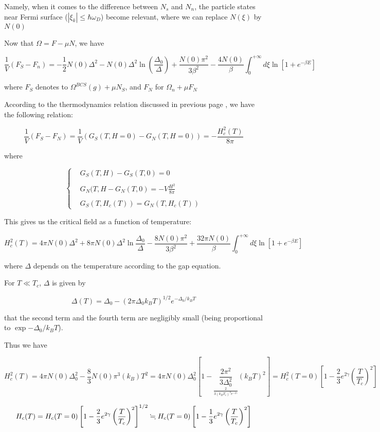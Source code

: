 Namely, when it comes to the difference between $N_s$ and $N_n$, the particle states near Fermi surface (${|\xi_k|\le \hbar\omega_D}$) become relevant, where we can replace $N(\xi)$ by $N(0)$

Now that $\Omega = F-\mu N$, we have

\[\frac{1}{V}(F_S-F_n) = -\frac{1}{2}N(0)\Delta^2 - N(0)\Delta^2\ln\left(\frac{\Delta_0}{\Delta}\right) + \frac{N(0)\pi^2}{3\beta^2}-\frac{4N(0)}{\beta}\int_0^{+\infty}d\xi\ln[1+e^{-\beta E}] \]

where $F_S$ denotes to $\Omega^{BCS}(g)+\mu N_S$, and $F_N$ for $\Omega_n + \mu F_N$

According to the thermodynamics relation discussed in previous page %
, we have the following relation: 

\[\frac{1}{V}(F_S-F_N) = \frac{1}{V}(G_S(T,H=0)-G_N(T,H=0)) = -\frac{H_c^2(T)}{8\pi} \]

where

\[\begin{cases}
&G_S(T,H) - G_S(T,0) = 0\\
& \\
&G_N(T,H - G_N(T,0) = -V\frac{H^2}{8\pi}\\
& \\
&G_S(T,H_c(T)) = G_N(T,H_c(T))
\end{cases}\]

This gives us the critical field as a function of temperature:

\[H_c^2(T) = 4\pi N(0)\Delta^2+8\pi N(0)\Delta^2\ln\frac{\Delta_0}{\Delta} - \frac{8N(0)\pi^2}{3\beta^2}+\frac{32\pi N(0)}{\beta}\int_0^{+\infty}d\xi\ln[1+e^{-\beta E}] \]

where $\Delta$ depends on the temperature according to the gap equation. 

For $T\ll T_c$, $\Delta$ is given by 

\[\Delta(T) =\Delta_0-(2\pi\Delta_0 k_BT)^{1/2}e^{-\Delta_0/k_BT} \]

that the second term and the fourth term are negligibly small (being proportional to $\exp{-\Delta_0/k_BT}$). 

Thus we have

\[H_c^2(T) = 4\pi N(0)\Delta_0^2-\frac{8}{3}N(0)\pi^3 (k_B)T^2  = 4\pi N(0)\Delta_0^2\left[1 - \underset{\frac{2}{3(k_BT_c)^2 e^{-2\gamma}}}{\frac{2\pi^2}{3\Delta_0^2}}(k_BT)^2\right] = H_c^2(T=0)\left[ 1 - \frac{2}{3} e^{2\gamma}\left(\frac{T}{T_c}\right)^2\right]\]

\[H_c(T) = H_c(T=0)\left[ 1 - \frac{2}{3} e^{2\gamma}\left(\frac{T}{T_c}\right)^2\right]^{1/2} \fallingdotseq H_c(T=0)\left[ 1 - \frac{1}{3} e^{2\gamma}\left(\frac{T}{T_c}\right)^2\right] \]

